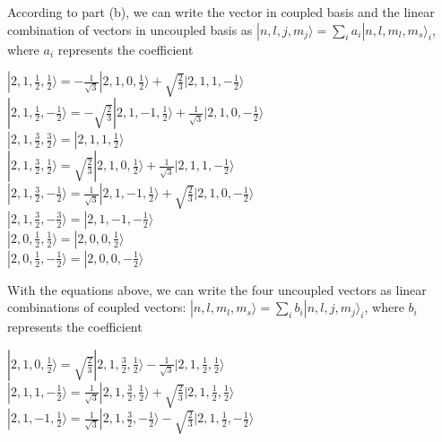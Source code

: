 \documentclass[12pt]{article}
\begin{document}
\begin{spacing}{2.0}
According to part (b), we can write the vector in coupled basis and the linear combination of vectors in uncoupled basis as $|n,l,j,m_j \rangle = \sum\limits_{i} a_i |n,l,m_l,m_s \rangle_i$, where $a_i$ represents the coefficient

$|2,1,\frac{1}{2},\frac{1}{2} \rangle = -\frac{1}{\sqrt{3}} |2,1,0,\frac{1}{2} \rangle + \sqrt{\frac{2}{3}}|2,1,1,-\frac{1}{2}\rangle$\\

$|2,1,\frac{1}{2},-\frac{1}{2} \rangle = -\sqrt{\frac{2}{3}} |2,1,-1,\frac{1}{2} \rangle + \frac{1}{\sqrt{3}} |2,1,0,-\frac{1}{2}\rangle$\\

$|2,1,\frac{3}{2},\frac{3}{2} \rangle = |2,1,1,\frac{1}{2} \rangle$\\

$|2,1,\frac{3}{2},\frac{1}{2} \rangle = \sqrt{\frac{2}{3}} |2,1,0,\frac{1}{2} \rangle + \frac{1}{\sqrt{3}}|2,1,1,-\frac{1}{2}\rangle$\\

$|2,1,\frac{3}{2},-\frac{1}{2} \rangle = \frac{1}{\sqrt{3}} |2,1,-1,\frac{1}{2} \rangle + \sqrt{\frac{2}{3}} |2,1,0,-\frac{1}{2}\rangle$\\

$|2,1,\frac{3}{2},-\frac{3}{2} \rangle = |2,1,-1,-\frac{1}{2} \rangle$\\

$|2,0,\frac{1}{2},\frac{1}{2} \rangle = |2,0,0,\frac{1}{2} \rangle$\\

$|2,0,\frac{1}{2},-\frac{1}{2} \rangle = |2,0,0,-\frac{1}{2} \rangle$

With the equations above, we can write the four uncoupled vectors as linear combinations of coupled vectors: $ |n,l,m_l,m_s \rangle = \sum\limits_{i} b_i  |n,l,j,m_j \rangle_i$, where $b_i$ represents the coefficient

$|2,1,0,\frac{1}{2} \rangle= \sqrt{\frac{2}{3}} |2,1,\frac{3}{2}, \frac{1}{2} \rangle - \frac{1}{\sqrt{3}} |2,1,\frac{1}{2}, \frac{1}{2} \rangle$\\

$|2,1,1,-\frac{1}{2} \rangle= \frac{1}{\sqrt{3}}  |2,1,\frac{3}{2}, \frac{1}{2} \rangle + \sqrt{\frac{2}{3}} |2,1,\frac{1}{2}, \frac{1}{2} \rangle$\\

$|2,1,-1,\frac{1}{2} \rangle= \frac{1}{\sqrt{3}} |2,1,\frac{3}{2}, -\frac{1}{2} \rangle -  \sqrt{\frac{2}{3}} |2,1,\frac{1}{2}, -\frac{1}{2} \rangle$\\


\end{spacing}
\end{document}
